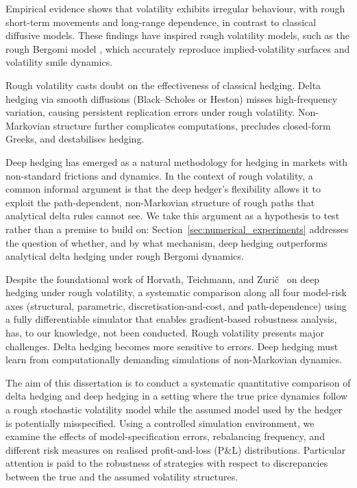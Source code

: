 \documentclass[12pt,a4paper]{article}
\theoremstyle{definition}
\theoremstyle{plain}
\theoremstyle{remark}
\theoremstyle{plain}
\begin{document}
Empirical evidence shows that volatility exhibits irregular behaviour, with rough short-term movements and long-range dependence, in contrast to classical diffusive models. These findings \cite{GatheralRough} have inspired rough volatility models, such as the rough Bergomi model \cite{BayerFriz2016}, which accurately reproduce implied-volatility surfaces and volatility smile dynamics.

Rough volatility casts doubt on the effectiveness of classical hedging. Delta hedging via smooth diffusions (Black–Scholes or Heston) misses high-frequency variation, causing persistent replication errors under rough volatility. Non-Markovian structure further complicates computations, precludes closed-form Greeks, and destabilises hedging.

Deep hedging has emerged as a natural methodology for hedging in markets with non-standard frictions and dynamics. In the context of rough volatility, a common informal argument is that the deep hedger's flexibility allows it to exploit the path-dependent, non-Markovian structure of rough paths that analytical delta rules cannot see. We take this argument as a hypothesis to test rather than a premise to build on: Section~\ref{sec:numerical_experiments} addresses the question of whether, and by what mechanism, deep hedging outperforms analytical delta hedging under rough Bergomi dynamics.

Despite the foundational work of Horvath, Teichmann, and Zuri\v{c}~\cite{Horvath2021DeepRough} on deep hedging under rough volatility, a systematic comparison along all four model-risk axes (structural, parametric, discretisation-and-cost, and path-dependence) using a fully differentiable simulator that enables gradient-based robustness analysis, has, to our knowledge, not been conducted. Rough volatility presents major challenges. Delta hedging becomes more sensitive to errors. Deep hedging must learn from computationally demanding simulations of non-Markovian dynamics.

The aim of this dissertation is to conduct a systematic quantitative comparison of delta hedging and deep hedging in a setting where the true price dynamics follow a rough stochastic volatility model while the assumed model used by the hedger is potentially misspecified. Using a controlled simulation environment, we examine the effects of model-specification errors, rebalancing frequency, and different risk measures on realised profit-and-loss (P\&L) distributions. Particular attention is paid to the robustness of strategies with respect to discrepancies between the true and the assumed volatility structures.
\end{document}

